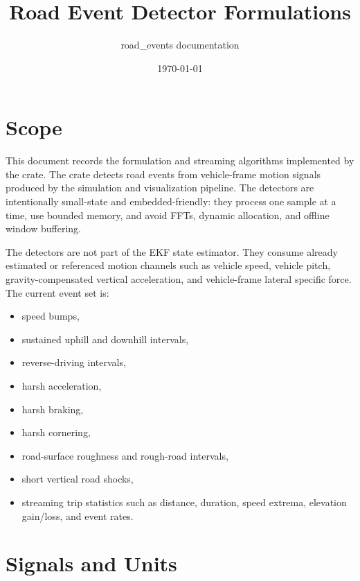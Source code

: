 \documentclass[11pt]{article}
\title{Road Event Detector Formulations}
\author{road\_events documentation}
\date{\today}
\begin{document}
\maketitle
\tableofcontents
\newpage

\section{Scope}

This document records the formulation and streaming algorithms implemented by the
 crate. The crate detects road events from vehicle-frame
motion signals produced by the simulation and visualization pipeline. The
detectors are intentionally small-state and embedded-friendly: they process one
sample at a time, use bounded memory, and avoid FFTs, dynamic allocation, and
offline window buffering.

The detectors are not part of the EKF state estimator. They consume already
estimated or referenced motion channels such as vehicle speed, vehicle pitch,
gravity-compensated vertical acceleration, and vehicle-frame lateral specific
force. The current event set is:
\begin{itemize}[nosep]
  \item speed bumps,
  \item sustained uphill and downhill intervals,
  \item reverse-driving intervals,
  \item harsh acceleration,
  \item harsh braking,
  \item harsh cornering,
  \item road-surface roughness and rough-road intervals,
  \item short vertical road shocks,
  \item streaming trip statistics such as distance, duration, speed extrema,
    elevation gain/loss, and event rates.
\end{itemize}

\section{Signals and Units}
\end{document}
